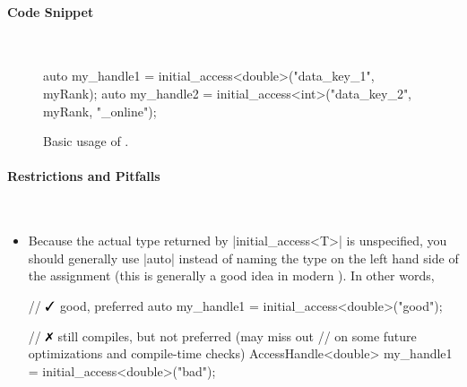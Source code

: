 \paragraph{Code Snippet}\mbox{}\\
\begin{figure}[!h]
\begin{CppCodeNumb}
  auto my_handle1 = initial_access<double>("data_key_1", myRank);
  auto my_handle2 = initial_access<int>("data_key_2", myRank, "_online");
\end{CppCodeNumb}
\label{fig:fe_api_initialaccess}
\caption{Basic usage of \protect{}.}
\end{figure}

\paragraph{Restrictions and Pitfalls}\mbox{}\\ 
\begin{itemize}
  \item Because the actual type returned by |initial_access<T>| is
  unspecified, you should generally use |auto| instead of naming the type on 
  the left hand side of the assignment (this is generally a good idea in modern
  \CC{}). In other words,
  \begin{CppCode}
	// $\yes$ good, preferred
	auto my_handle1 = initial_access<double>("good"); 

	// $\no$ still compiles, but not preferred (may miss out
	//  on some future optimizations and compile-time checks)
	AccessHandle<double> my_handle1 = initial_access<double>("bad"); 
  \end{CppCode}
\end{itemize}




